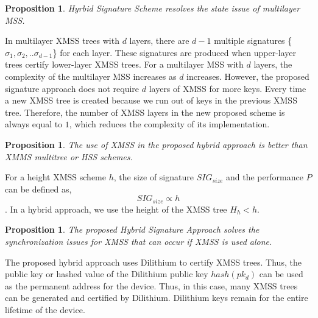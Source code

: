 \documentclass[5p,times]{elsarticle}
\newtheorem{prop}[thm]{Proposition}
\theoremstyle{definition}
\theoremstyle{remark}
\numberwithin{equation}{section}
\begin{document}
\begin{prop} \label{prop:hybridsolvesmulti}
Hyrbid Signature Scheme resolves the state issue of multilayer MSS.
\end{prop}
In multilayer XMSS trees with $d$ layers, there are $d-1$ multiple signatures \{$\sigma_1,\sigma_2, .. \sigma_{d-1} $\} for each layer.
These signatures are produced when upper-layer trees certify lower-layer
XMSS trees.
For a multilayer MSS with $d$ layers,
the complexity of the multilayer MSS increases as $d$ increases.
However, the proposed signature approach does not require $d$ layers of XMSS for more keys.
Every time a new XMSS tree is created because we run out of keys in the previous XMSS tree.
Therefore, the number of XMSS layers in the new proposed scheme is always equal to $1$, which reduces the complexity of its implementation.

\begin{prop}
The use of XMSS in the proposed hybrid approach is better than XMMS multitree or HSS schemes.
\end{prop}
For a height XMSS scheme $h$, the size of signature $SIG_{size}$ and the performance $P$ can be defined as, 
$$SIG_{size} \propto h$$.
In a hybrid approach, we use the height of the XMSS tree $H_h < h$.

\begin{prop} \label{prop:synchronization}
The proposed Hybrid Signature Approach solves the synchronization issues for XMSS that can occur if XMSS is used alone.
\end{prop}
The proposed hybrid approach uses Dilithium to certify XMSS trees.
Thus, the public key or hashed value of the Dilithium public key $hash(pk_d)$ can be used as the permanent address for the device.
Thus, in this case, many XMSS trees can be generated and certified by Dilithium.
Dilithium keys remain for the entire lifetime of the device.
\end{document}
